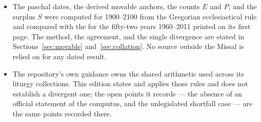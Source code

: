 \begin{itemize}[leftmargin=1.3em, itemsep=0.3em]
\item The paschal dates, the derived movable anchors, the counts $E$ and $P$, and the surplus $S$
were computed for 1900--2100 from the Gregorian ecclesiastical rule and compared with the
 for the fifty-two years 1960--2011 printed on its first page. The
method, the agreement, and the single divergence are stated in Sections~\ref{sec:movable}
and~\ref{sec:collation}. No source outside the Missal is relied on for any dated result.
\item The repository's own  guidance owns the shared arithmetic
used across its liturgy collections. This edition states and applies those rules and does not
establish a divergent one; the open points it records — the absence of an official statement of
the computus, and the unlegislated shortfall case — are the same points recorded there.
\end{itemize}
